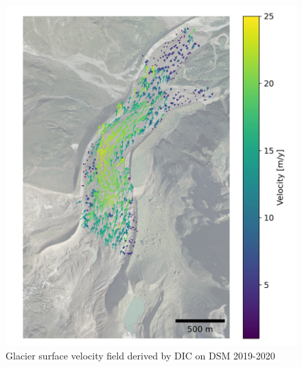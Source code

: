 \begin{figure}
    \centering
    \includegraphics[height=\textheight]{figures/chapter3/velocity_DIC_2019-2020.png}
    \caption{Glacier surface velocity field derived by DIC on DSM 2019-2020}
\end{figure}

